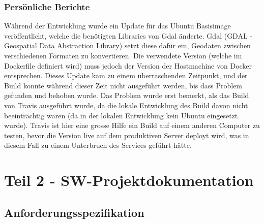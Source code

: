 \subsection{Pers\"onliche Berichte}
W\"ahrend der Entwicklung wurde ein Update f\"ur das Ubuntu Basisimage ver\"offentlicht, welche die ben\"otigten Libraries von Gdal \"anderte. Gdal (GDAL - Geospatial Data Abstraction Library) setzt diese daf\"ur ein, Geodaten zwischen verschiedenen Formaten zu konvertieren. Die verwendete Version (welche im Dockerfile definiert wird) muss jedoch der Version der Hostmachine von Docker entsprechen. Dieses Update kam zu einem \"uberraschenden Zeitpunkt, und der Build konnte w\"ahrend dieser Zeit nicht ausgef\"uhrt werden, bis dass Problem gefunden und behoben wurde. Das Problem wurde erst bemerkt, als das Build von Travis ausgef\"uhrt wurde, da die lokale Entwicklung des Build davon nicht beeintr\"achtig waren (da in der lokalen Entwicklung kein Ubuntu eingesetzt wurde). Travis ist hier eine grosse Hilfe ein Build auf einem anderen Computer zu testen, bevor die Version live auf dem produktiven Server deployt wird, was in diesem Fall zu einem Unterbruch des Services gef\"uhrt h\"atte.

\clearpage
\pagebreak


\chapter{Teil 2 - SW-Projektdokumentation}
\section{Anforderungsspezifikation}
